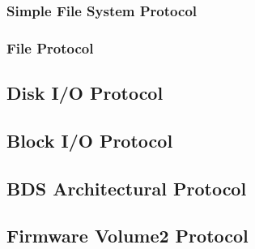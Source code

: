 \subsubsection{Simple File System Protocol}



\subsubsection{File Protocol}



\clearpage

\subsection{Disk \acs{I/O} Protocol}


\clearpage

\subsection{Block \acs{I/O} Protocol}


\clearpage

\subsection{\acf{BDS} Architectural Protocol}



\clearpage

\subsection{Firmware Volume2 Protocol}



